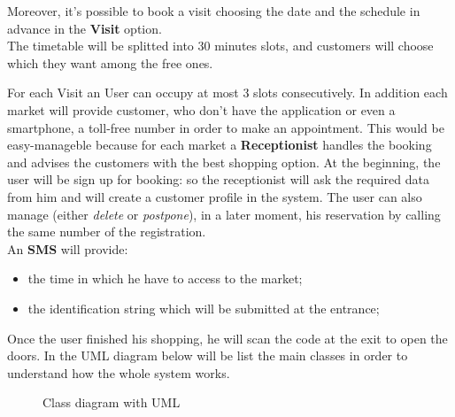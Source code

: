 \par
Moreover, it's possible to book a visit choosing the date and the schedule in advance in the \textbf{Visit} option. 
\\
The timetable will be splitted into 30 minutes slots, and customers will choose which they want among the free ones. \par
For each Visit an User can occupy at most 3 slots consecutively.
In addition each market will provide customer, who don't have the application or even a smartphone, a toll-free number in order to make an appointment.
This would be easy-manageble because for each market a \textbf{Receptionist} handles the booking and advises the customers with the best shopping option. 
At the beginning, the user will be sign up for booking: so the receptionist will ask the required data from him and will create a customer profile in the system.
The user can also manage (either \textit{delete} or \textit{postpone}), in a later moment, his reservation by calling the same number of the registration.
\\
An \textbf{SMS} will provide:
\begin{itemize}
\item the time in which he have to access to the market;
\item the identification string which will be submitted at the entrance;
\end{itemize}

Once the user finished his shopping, he will scan the code at the exit to open the doors.
\bigskip
In the UML diagram below will be list the main classes in order to understand how the whole system works.

\par 
\bigskip
\bigskip
\begin{figure}[H]
  \label{fig:UML}
  \centering
  \caption{Class diagram with UML}
\end{figure}



